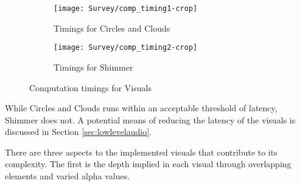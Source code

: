 \documentclass[../initial_thesis.tex]{subfiles}
\begin{document}
\begin{figure}
  \begin{subfigure}{0.5\textwidth}
    \centering
    \texttt{[image: Survey/comp\_timing1-crop]}
    \caption{Timings for Circles and Clouds}
    \label{fig:timings_circlesclouds}
  \end{subfigure}
  \begin{subfigure}{0.5\textwidth}
    \centering
    \texttt{[image: Survey/comp\_timing2-crop]}
    \caption{Timings for Shimmer}
    \label{fig:timings_shimmer}
  \end{subfigure}
  \caption{Computation timings for Visuals}
  \label{fig:comp_timings}
\end{figure}

While Circles and Clouds runs within an acceptable threshold of latency, Shimmer does not. A potential means of reducing the latency of the visuals is discussed in Section \ref{sec:lowlevelaudio}. \par

There are three aspects to the implemented visuals that contribute to its complexity. The first is the depth implied in each visual through overlapping elements and varied alpha values. 
\end{document}
